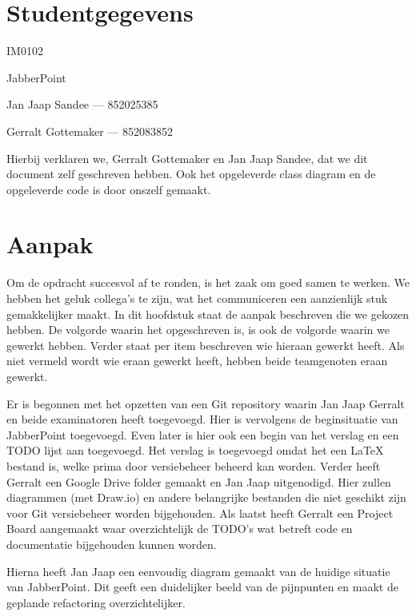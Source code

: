 \documentclass[a4paper]{article}
\newcommand{\1}[0]{\'{e}\'{e}n}
\begin{document}
\pagestyle{fancy}

\section*{Studentgegevens}
\begin{description}
	\item [Cursuscode] IM0102
	\item JabberPoint
    \item Jan Jaap Sandee --- 852025385
	\item Gerralt Gottemaker --- 852083852
\end{description}

Hierbij verklaren we, Gerralt Gottemaker en Jan Jaap Sandee, dat we dit document zelf geschreven hebben. Ook het opgeleverde class diagram en de opgeleverde code is door onszelf gemaakt.

\section*{Aanpak}
Om de opdracht succesvol af te ronden, is het zaak om goed samen te werken. We hebben het geluk collega's te zijn, wat het communiceren een aanzienlijk stuk gemakkelijker maakt. In dit hoofdstuk staat de aanpak beschreven die we gekozen hebben. De volgorde waarin het opgeschreven is, is ook de volgorde waarin we gewerkt hebben. Verder staat per item beschreven wie hieraan gewerkt heeft. Als niet vermeld wordt wie eraan gewerkt heeft, hebben beide teamgenoten eraan gewerkt.

Er is begonnen met het opzetten van een Git repository waarin Jan Jaap Gerralt en beide examinatoren heeft toegevoegd. Hier is vervolgens de beginsituatie van JabberPoint toegevoegd. Even later is hier ook een begin van het verslag en een TODO lijst aan toegevoegd. Het verslag is toegevoegd omdat het een LaTeX bestand is, welke prima door versiebeheer beheerd kan worden. Verder heeft Gerralt een Google Drive folder gemaakt en Jan Jaap uitgenodigd. Hier zullen diagrammen (met Draw.io) en andere belangrijke bestanden die niet geschikt zijn voor Git versiebeheer worden bijgehouden. Als laatst heeft Gerralt een Project Board aangemaakt waar overzichtelijk de TODO's wat betreft code en documentatie bijgehouden kunnen worden.

Hierna heeft Jan Jaap een eenvoudig diagram gemaakt van de huidige situatie van JabberPoint. Dit geeft een duidelijker beeld van de pijnpunten en maakt de geplande refactoring overzichtelijker.
\end{document}

